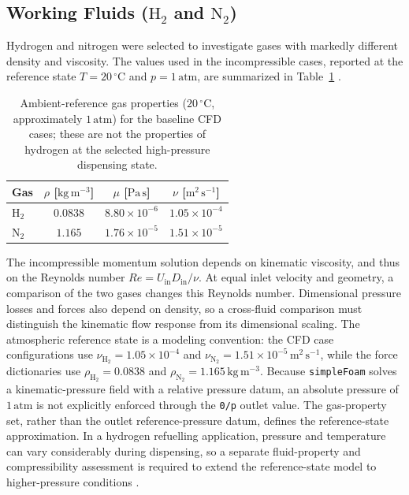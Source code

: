 \subsection{Working Fluids ($\mathrm{H}_2$ and $\mathrm{N}_2$)}
Hydrogen and nitrogen were selected to investigate gases with markedly different density and viscosity. The values used in the incompressible cases, reported at the reference state $T=20\,^{\circ}\mathrm{C}$ and $p=1\,\mathrm{atm}$, are summarized in Table~\ref{tab:fluid_properties} \cite{nist_refprop}.

\begin{table}[htbp]
\centering
\small
\begin{tabular}{@{}lccc@{}}
\toprule
\textbf{Gas} & $\rho$ [$\mathrm{kg\,m^{-3}}$] & $\mu$ [$\mathrm{Pa\,s}$] & $\nu$ [$\mathrm{m^2\,s^{-1}}$]\\
\midrule
$\mathrm{H}_2$ & $0.0838$ & $8.80\times10^{-6}$ & $1.05\times10^{-4}$\\
$\mathrm{N}_2$ & $1.165$ & $1.76\times10^{-5}$ & $1.51\times10^{-5}$\\
\bottomrule
\end{tabular}
\caption{Ambient-reference gas properties ($20\,^{\circ}\mathrm{C}$, approximately $1\,\mathrm{atm}$) for the baseline CFD cases; these are not the properties of hydrogen at the selected high-pressure dispensing state.}
\label{tab:fluid_properties}

\end{table}

The incompressible momentum solution depends on kinematic viscosity, and thus on the Reynolds number $Re=U_{\mathrm{in}}D_{\mathrm{in}}/\nu$. At equal inlet velocity and geometry, a comparison of the two gases changes this Reynolds number. Dimensional pressure losses and forces also depend on density, so a cross-fluid comparison must distinguish the kinematic flow response from its dimensional scaling. The atmospheric reference state is a modeling convention: the CFD case configurations use $\nu_{\mathrm{H}_2}=1.05\times10^{-4}$ and $\nu_{\mathrm{N}_2}=1.51\times10^{-5}\,\mathrm{m^2\,s^{-1}}$, while the force dictionaries use $\rho_{\mathrm{H}_2}=0.0838$ and $\rho_{\mathrm{N}_2}=1.165\,\mathrm{kg\,m^{-3}}$. Because \texttt{simpleFoam} solves a kinematic-pressure field with a relative pressure datum, an absolute pressure of $1\,\mathrm{atm}$ is not explicitly enforced through the \texttt{0/p} outlet value. The gas-property set, rather than the outlet reference-pressure datum, defines the reference-state approximation. In a hydrogen refuelling application, pressure and temperature can vary considerably during dispensing, so a separate fluid-property and compressibility assessment is required to extend the reference-state model to higher-pressure conditions \cite{sae_j2601,nist_refprop}.

